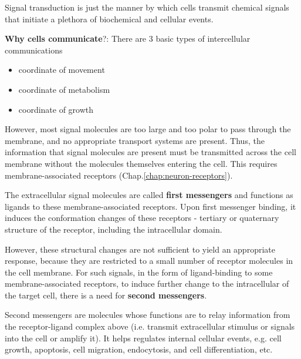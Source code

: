 
\label{chap:second-mess-syst}

Signal transduction is just the manner by which cells transmit chemical
signals that initiate a plethora of biochemical and cellular events.

{\bf Why cells communicate}?: There are 3 basic types of intercellular
communications
\begin{itemize}
  \item coordinate of movement
  \item coordinate of metabolism
  \item coordinate of growth
\end{itemize}


However, most signal molecules are too large and too polar to pass through the
membrane, and no appropriate transport systems are present. Thus, the
information that signal molecules are present must be transmitted across the
cell membrane without the molecules themselves entering the cell.
This requires membrane-associated receptors (Chap.\ref{chap:neuron-receptors}).

The extracellular signal molecules are called {\bf first messengers} and
functions as ligands to these membrane-associated receptors. Upon first
messenger binding, it induces the conformation changes of these receptors - 
tertiary or quaternary structure of the receptor, including the intracellular domain.

However, these structural changes are not sufficient to yield an appropriate
response, because they are restricted to a small number of receptor molecules in
the cell membrane. For such signals, in the form of ligand-binding to some
membrane-associated receptors, to induce further change to the intracellular of
the target cell, there is a need for {\bf second messengers}.




Second messengers are molecules whose functions are to relay information from
the receptor-ligand complex above (i.e. transmit extracellular stimulus or
signals into the cell or amplify it).
It helps regulates internal cellular events, e.g. cell growth, apoptosis, cell
migration, endocytosis, and cell differentiation, etc.

